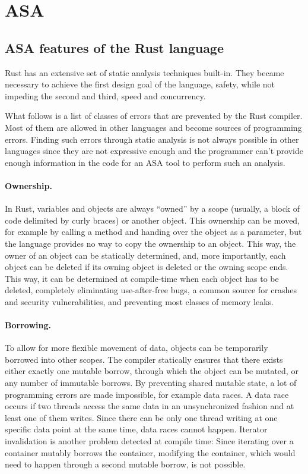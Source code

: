 \documentclass{scrartcl}
\begin{document}
\section{ASA}



\subsection{ASA features of the Rust language} \label{rust_features}

Rust has an extensive set of static analysis techniques built-in. They became necessary to achieve the first design goal of the language, safety, while not impeding the second and third, speed and concurrency.

What follows is a list of classes of errors that are prevented by the Rust compiler. Most of them are allowed in other languages and become sources of programming errors. Finding such errors through static analysis is not always possible in other languages since they are not expressive enough and the programmer can't provide enough information in the code for an ASA tool to perform such an analysis.

\paragraph{Ownership.} In Rust, variables and objects are always "`owned"' by a scope (usually, a block of code delimited by curly braces) or another object. This ownership can be moved, for example by calling a method and handing over the object as a parameter, but the language provides no way to copy the ownership to an object. This way, the owner of an object can be statically determined, and, more importantly, each object can be deleted if its owning object is deleted or the owning scope ends. This way, it can be determined at compile-time when each object has to be deleted, completely eliminating use-after-free bugs, a common source for crashes and security vulnerabilities, and preventing most classes of memory leaks.

\paragraph{Borrowing.} To allow for more flexible movement of data, objects can be temporarily borrowed into other scopes. The compiler statically ensures that there exists either exactly one mutable borrow, through which the object can be mutated, or any number of immutable borrows. By preventing shared mutable state, a lot of programming errors are made impossible, for example data races. A data race occurs if two threads access the same data in an unsynchronized fashion and at least one of them writes. Since there can be only one thread writing at one specific data point at the same time, data races cannot happen. Iterator invalidation is another problem detected at compile time: Since iterating over a container mutably borrows the container, modifying the container, which would need to happen through a second mutable borrow, is not possible.
\end{document}

